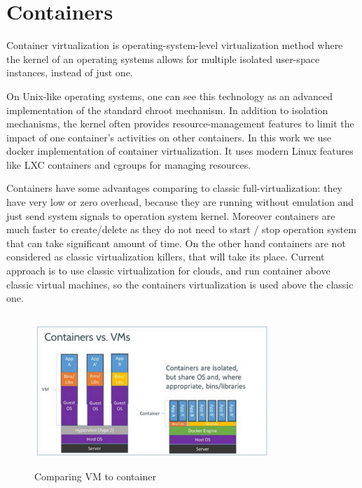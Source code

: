 \section{Containers}
\begin{sloppypar}
Container virtualization is operating-system-level virtualization method where the kernel of an operating systems allows for multiple isolated user-space instances, instead of just one.

On Unix-like operating systems, one can see this technology as an advanced implementation of the standard chroot mechanism. In addition to isolation mechanisms, the kernel often provides resource-management features to limit the impact of one container's activities on other containers.
In this work we use docker implementation of container virtualization. It uses modern Linux features like LXC containers and cgroups for managing resources. 

Containers have some advantages comparing to classic full-virtualization: they have very low or zero overhead, because they are running without emulation and just send system signals to operation system kernel. Moreover containers are much faster to create/delete as they do not need to start / stop operation system that can take significant amount of time. On the other hand containers are not considered as classic virtualization killers, that will take its place. Current approach is to use classic virtualization for clouds, and run container above classic virtual machines, so the containers virtualization is used above the classic one.
\end{sloppypar}

\begin{figure}[h]
  \centering
    \includegraphics[width=335px,height=217px,natwidth=770,natheight=434]{./pictures/docker-vm-container}
    \caption{Comparing VM to container}
\end{figure}

